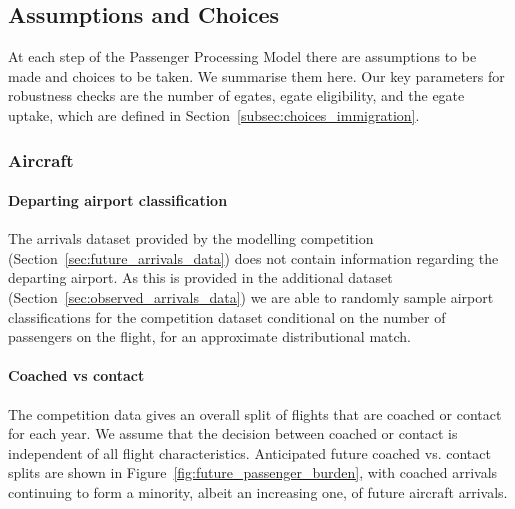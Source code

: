 \documentclass[10pt]{article}
\begin{document}
\subsection{Assumptions and Choices}
At each step of the Passenger Processing Model there are assumptions to be made and choices to be taken. We summarise them here. Our key parameters for robustness checks are the number of \glspl{egate}, \gls{egate} eligibility, and the \gls{egate} uptake, which are defined in Section~\ref{subsec:choices_immigration}.

\subsubsection{Aircraft}

\paragraph{Departing airport classification}
The arrivals dataset provided by the modelling competition (Section~\ref{sec:future_arrivals_data}) does not contain information regarding the departing airport. As this is provided in the additional dataset (Section~\ref{sec:observed_arrivals_data}) we are able to randomly sample airport classifications for the competition dataset conditional on the number of passengers on the flight, for an approximate distributional match. 




\paragraph{Coached vs contact}
The competition data gives an overall split of flights that are coached or contact for each year. We assume that the decision between coached or contact is independent of all flight characteristics. Anticipated future coached vs. contact splits are shown in Figure~\ref{fig:future_passenger_burden}, with coached arrivals continuing to form a minority, albeit an increasing one, of future aircraft arrivals.
\end{document}
